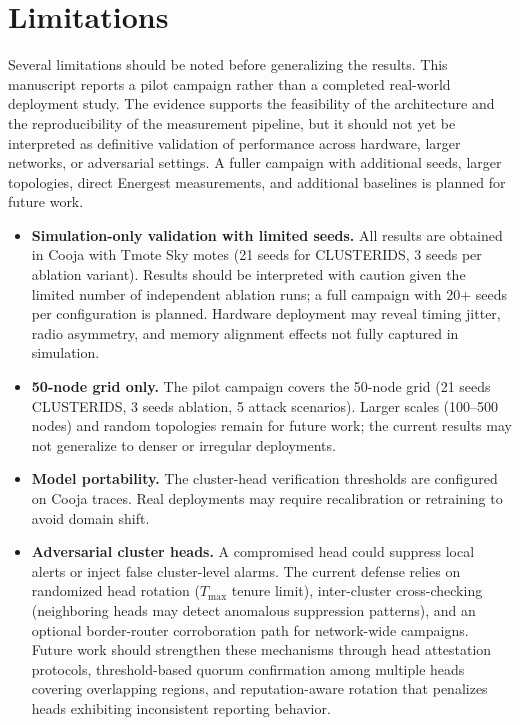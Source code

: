 \section{Limitations}
\label{sec:limitations}

Several limitations should be noted before generalizing the results.
This manuscript reports a pilot campaign rather than a completed real-world deployment study. The evidence supports the feasibility of the architecture and the reproducibility of the measurement pipeline, but it should not yet be interpreted as definitive validation of performance across hardware, larger networks, or adversarial settings. A fuller campaign with additional seeds, larger topologies, direct Energest measurements, and additional baselines is planned for future work.
\begin{itemize}
  \item \textbf{Simulation-only validation with limited seeds.} All results are obtained in Cooja with Tmote Sky motes (21 seeds for CLUSTERIDS, 3 seeds per ablation variant). Results should be interpreted with caution given the limited number of independent ablation runs; a full campaign with 20+ seeds per configuration is planned.
  Hardware deployment may reveal timing jitter, radio asymmetry, and memory alignment effects not fully captured in simulation.
  \item \textbf{50-node grid only.} The pilot campaign covers the 50-node grid (21 seeds CLUSTERIDS, 3 seeds ablation, 5 attack scenarios).
  Larger scales (100--500 nodes) and random topologies remain for future work; the current results may not generalize to denser or irregular deployments.
  \item \textbf{Model portability.} The cluster-head verification thresholds are configured on Cooja traces.
  Real deployments may require recalibration or retraining to avoid domain shift.
  \item \textbf{Adversarial cluster heads.} A compromised head could suppress local alerts or inject false cluster-level alarms.
  The current defense relies on randomized head rotation ($T_{\max}$ tenure limit), inter-cluster cross-checking (neighboring heads may detect anomalous suppression patterns), and an optional border-router corroboration path for network-wide campaigns.
  Future work should strengthen these mechanisms through head attestation protocols, threshold-based quorum confirmation among multiple heads covering overlapping regions, and reputation-aware rotation that penalizes heads exhibiting inconsistent reporting behavior.

\end{itemize}
